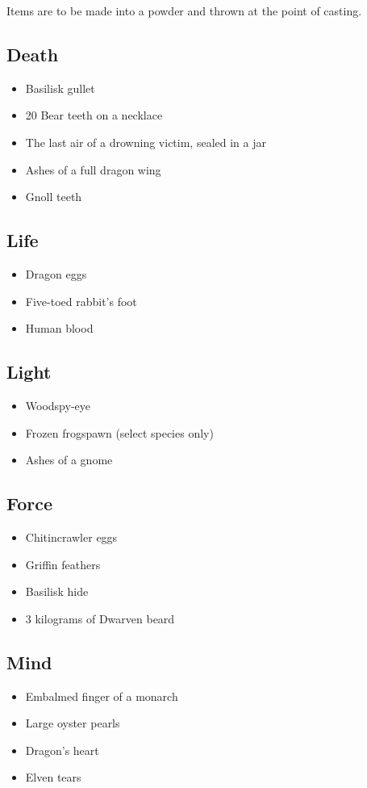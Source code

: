 \begin{multicols}{2}

Items are to be made into a powder and thrown at the point of casting.

\subsection{Death}

\begin{itemize}
  \item
  Basilisk gullet
  \item
  20 Bear teeth on a necklace
  \item
  The last air of a drowning victim, sealed in a jar
  \item
  Ashes of a full dragon wing
  \item
  Gnoll teeth
\end{itemize}

\subsection{Life}

\begin{itemize}
  \item
  Dragon eggs
  \item
  Five-toed rabbit's foot
  \item
  Human blood
\end{itemize}

\subsection{Light}

\begin{itemize}
  \item
  Woodspy-eye
  \item
  Frozen frogspawn (select species only)
  \item
  Ashes of a gnome
\end{itemize}

\subsection{Force}

\begin{itemize}
  \item
  Chitincrawler eggs
  \item
  Griffin feathers
  \item
  Basilisk hide
  \item
  3 kilograms of Dwarven beard
\end{itemize}

\subsection{Mind}

\begin{itemize}
  \item
  Embalmed finger of a monarch
  \item
  Large oyster pearls
  \item
  Dragon's heart
  \item
  Elven tears
\end{itemize}

\end{multicols}
